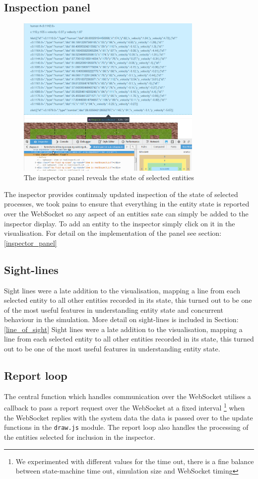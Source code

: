 \subsection{Inspection panel}
\begin{figure}[h]
  \centering
  \includegraphics[width=0.8\textwidth]{img/inspector.png}
\caption{The inspector panel reveals the state of selected entities}
    \label{fig:inspector}
\end{figure}
The inspector provides continualy updated inspection of the state of selected processes, we took pains to ensure that everything in the entity state is reported over the WebSocket so any aspect of an entities sate can simply be added to the inspector display. To add an entity to the inspector simply click on it in the visualisation. For detail on the implementation of the panel see section:\ref{inspector_panel}
\subsection{Sight-lines}
\label{sight_lines}
Sight lines were a late addition to the visualisation, mapping a line from each selected entity to all other entities recorded in its state, this turned out to be one of the most useful features in understanding entity state and concurrent behaviour in the simulation. More detail on sight-lines is included in Section:\ref{line_of_sight} 
Sight lines were a late addition to the visualisation, mapping a line from each selected entity to all other entities recorded in its state, this turned out to be one of the most useful features in understanding entity state.
\subsection{Report loop}
The central function which handles communication over the WebSocket utilises a callback to pass a report request over the WebSocket at a fixed interval \footnote{We experimented with different values for the time out, there is a fine balance between state-machine time out, simulation size and WebSocket timing} when the WebSocket replies with the system data the data is passed over to the update functions in the \verb+draw.js+ module. The report loop also handles the processing of the entities selected for inclusion in the inspector.
\clearpage
\endinput
